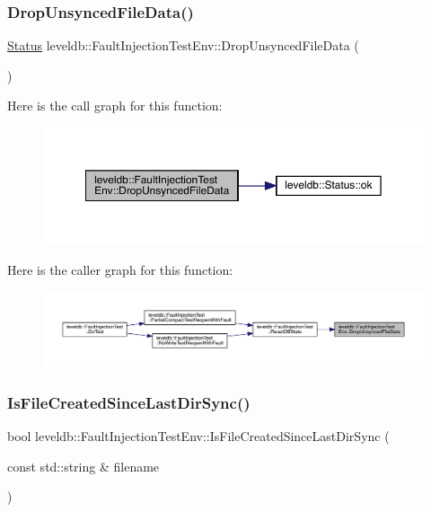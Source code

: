 \subsubsection{\texorpdfstring{DropUnsyncedFileData()}{DropUnsyncedFileData()}}
{\footnotesize\ttfamily \mbox{\hyperlink{classleveldb_1_1_status}{Status}} leveldb\+::\+Fault\+Injection\+Test\+Env\+::\+Drop\+Unsynced\+File\+Data (\begin{DoxyParamCaption}{ }\end{DoxyParamCaption})}

Here is the call graph for this function\+:
\nopagebreak
\begin{figure}[H]
\begin{center}
\leavevmode
\includegraphics[width=350pt]{classleveldb_1_1_fault_injection_test_env_a4201d9bce4e169d3a5320c3ecbf05490_cgraph}
\end{center}
\end{figure}
Here is the caller graph for this function\+:
\nopagebreak
\begin{figure}[H]
\begin{center}
\leavevmode
\includegraphics[width=350pt]{classleveldb_1_1_fault_injection_test_env_a4201d9bce4e169d3a5320c3ecbf05490_icgraph}
\end{center}
\end{figure}
\mbox{\label{classleveldb_1_1_fault_injection_test_env_ae9460fecd27d35869bfc4de6ff4538e3}} 
\subsubsection{\texorpdfstring{IsFileCreatedSinceLastDirSync()}{IsFileCreatedSinceLastDirSync()}}
{\footnotesize\ttfamily bool leveldb\+::\+Fault\+Injection\+Test\+Env\+::\+Is\+File\+Created\+Since\+Last\+Dir\+Sync (\begin{DoxyParamCaption}\item[{const std\+::string \&}]{filename }\end{DoxyParamCaption})}

